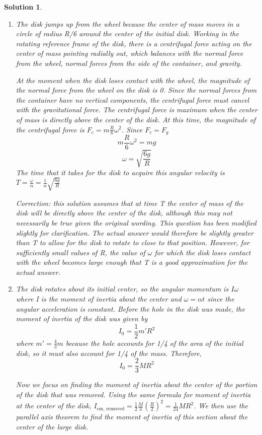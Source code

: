 \documentclass[12pt]{article}
\newtheorem*{solution}{Solution}
\theoremstyle{mystyle}
\begin{document}
\begin{solution}
    \begin{enumerate}[\Alph*)]
        \item The disk jumps up from the wheel because the center of mass moves in a circle of radius R/6 around the center of the initial disk. Working in the rotating reference frame of the disk, there is a centrifugal force acting on the center of mass pointing radially out, which balances with the normal force from the wheel, normal forces from the side of the container, and gravity. 
        
        At the moment when the disk loses contact with the wheel, the magnitude of the normal force from the wheel on the disk is 0. Since the normal forces from the container have no vertical components, the centrifugal force must cancel with the gravitational force. The centrifugal force is maximum when the center of mass is directly above the center of the disk. At this time, the magnitude of the centrifugal force is $F_c = m\frac{R}{6}\omega ^2$. Since $F_c = F_g$
        $$m\frac{R}{6}\omega ^2 = mg$$
        $$\omega = \sqrt{\frac{6g}{R}}$$
        The time that it takes for the disk to acquire this angular velocity is $T = \frac{\omega}{\alpha} = \boxed{\frac{1}{\alpha}\sqrt{\frac{6g}{R}}}$

        Correction: this solution assumes that at time T the center of mass of the disk will be directly above the center of the disk, although this may not necessarily be true given the original wording. This question has been modified slightly for clarification. The actual answer would therefore be slightly greater than T to allow for the disk to rotate to close to that position. However, for sufficiently small values of R, the value of $\omega$ for which the disk loses contact with the wheel becomes large enough that T is a good approximation for the actual answer. 

        \item The disk rotates about its initial center, so the angular momentum is $I\omega$ where I is the moment of inertia about the center and $\omega = \alpha t$ since the angular acceleration is constant. Before the hole in the disk was made, the moment of inertia of the disk was given by $$I_0 = \frac{1}{2}m'R^2$$ where $m' = \frac{4}{3}m$ because the hole accounts for 1/4 of the area of the initial disk, so it must also account for 1/4 of the mass. Therefore,
        $$I_0 = \frac{2}{3}MR^2$$

        Now we focus on finding the moment of inertia about the center of the portion of the disk that was removed. Using the same formula for moment of inertia at the center of the disk, $I_{\text{cm, removed}} = \frac{1}{2}\frac{M}{3}(\frac{R}{2})^2 = \frac{1}{24}MR^2$. We then use the parallel axis theorem to find the moment of inertia of this section about the center of the large disk.  


\end{enumerate}
\end{solution}
\end{document}
